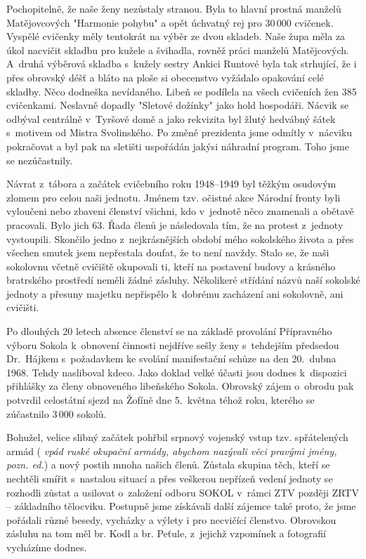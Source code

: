 \documentclass[a5paper, 11pt, twoside]{article}
\newcommand{\pozned}[1]{%
\textit{#1}}
\begin{document}
Pochopitelně, že naše ženy nezůstaly stranou. Byla to hlavní prostná
manželů Matějovcových "Harmonie pohybu" a opět úchvatný rej pro 30\,000
cvičenek. Vyspělé cvičenky měly tentokrát na výběr ze dvou skladeb. Naše
župa měla za úkol nacvičit skladbu pro kužele a švihadla, rovněž práci
manželů Matějcových. A~druhá výběrová skladba s~kužely sestry Ankici
Runtové byla tak strhující, že i přes obrovský déšť a bláto na ploše si
obecenstvo vyžádalo opakování celé skladby. Něco dodneška nevídaného.
Libeň se podílela na všech cvičeních žen 385 cvičenkami. Neslavně
dopadly "Sletové dožínky" jako hold hospodáři. Nácvik se odbýval
centrálně v~Tyršově domě a jako rekvizita byl žlutý hedvábný šátek
s~motivem od Mistra Svolinského. Po změně prezidenta jsme odmítly
v~nácviku pokračovat a byl pak na sletišti uspořádán jakýsi náhradní
program. Toho jsme se nezúčastnily.

Návrat z~tábora a začátek cvičebního roku 1948--1949 byl
těžkým osudovým zlomem pro celou naši jednotu. Jménem tzv. očistné akce
Národní fronty byli vyloučeni nebo zbaveni členství všichni, kdo
v~jednotě něco znamenali a obětavě pracovali. Bylo jich 63. Řada členů je
následovala tím, že na protest z~jednoty vystoupili. Skončilo jedno
z~nejkrásnějších období mého sokolského života a přes všechen smutek jsem
nepřestala doufat, že to není navždy. Stalo se, že naši sokolovnu včetně
cvičiště okupovali ti, kteří na postavení budovy a krásného bratrského
prostředí neměli žádné zásluhy. Několikeré střídání názvů naší sokolské
jednoty a přesuny majetku nepřispělo k~dobrému zacházení ani sokolovně,
ani cvičišti.

Po dlouhých 20 letech absence členství se na základě provolání
Přípravného výboru Sokola k~obnovení činnosti nejdříve sešly ženy
s~tehdejším předsedou Dr.~Hájkem s~požadavkem ke svolání manifestační
schůze na den 20.~dubna 1968. Tehdy nasliboval kdeco. Jako doklad velké
účasti jsou dodnes k~dispozici přihlášky za členy obnoveného libeňského
Sokola. Obrovský zájem o~obrodu pak potvrdil celostátní sjezd na Žofíně
dne 5.~května téhož roku, kterého se zúčastnilo 3\,000 sokolů.

Bohužel, velice slibný začátek pohřbil srpnový vojenský vstup tzv.
spřátelených armád (\pozned{vpád ruské okupační armády, abychom nazývali
věci pravými jmény, pozn. ed.}) a nový postih mnoha našich členů.
Zůstala skupina těch, kteří se nechtěli smířit s~nastalou situací a přes
veškerou nepřízeň vedení jednoty se rozhodli zůstat a usilovat
o~založení odboru SOKOL v~rámci ZTV později ZRTV -- základního tělocviku.
Postupně jsme získávali další zájemce také proto, že jsme pořádali různé
besedy, vycházky a výlety i pro necvičící členstvo. Obrovskou zásluhu na
tom měl br. Kodl a br. Peťule, z~jejichž vzpomínek a fotografií
vycházíme dodnes.
\end{document}
